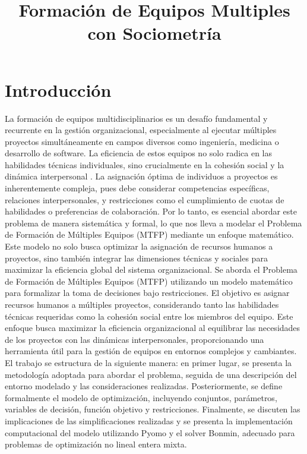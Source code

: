 \documentclass[conference]{IEEEtran}
\begin{document}
\title{Formación de Equipos Multiples con Sociometría}

\author{
}

\maketitle

\begin{abstract}
\end{abstract}


\section{Introducción}
La formación de equipos multidisciplinarios es un desafío fundamental y recurrente en la gestión organizacional, especialmente al ejecutar múltiples proyectos simultáneamente en campos diversos como ingeniería, medicina o desarrollo de software. La eficiencia de estos equipos no solo radica en las habilidades técnicas individuales, sino crucialmente en la cohesión social y la dinámica interpersonal \cite{gutierrez2016multiple}. La asignación óptima de individuos a proyectos es inherentemente compleja, pues debe considerar competencias específicas, relaciones interpersonales, y restricciones como el cumplimiento de cuotas de habilidades o preferencias de colaboración.
Por lo tanto, es esencial abordar este problema de manera sistemática y formal, lo que nos lleva a modelar el Problema de Formación de Múltiples Equipos (MTFP) mediante un enfoque matemático. Este modelo no solo busca optimizar la asignación de recursos humanos a proyectos, sino también integrar las dimensiones técnicas y sociales para maximizar la eficiencia global del sistema organizacional.
Se aborda el Problema de Formación de Múltiples Equipos (MTFP) utilizando un modelo matemático para formalizar la toma de decisiones bajo restricciones.
El objetivo es asignar recursos humanos a múltiples proyectos, considerando tanto las habilidades técnicas requeridas como la cohesión social entre los miembros del equipo. Este enfoque busca maximizar la eficiencia organizacional al equilibrar las necesidades de los proyectos con las dinámicas interpersonales, proporcionando una herramienta útil para la gestión de equipos en entornos complejos y cambiantes.
El trabajo se estructura de la siguiente manera: en primer lugar, se presenta la metodología adoptada para abordar el problema, seguida de una descripción del entorno modelado y las consideraciones realizadas. Posteriormente, se define formalmente el modelo de optimización, incluyendo conjuntos, parámetros, variables de decisión, función objetivo y restricciones. Finalmente, se discuten las implicaciones de las simplificaciones realizadas y se presenta la implementación computacional del modelo utilizando Pyomo y el solver Bonmin, adecuado para problemas de optimización no lineal entera mixta.
\end{document}

